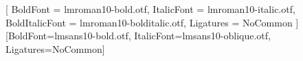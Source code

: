 %
%

\newcommand{\nomcandidat}{Prenom NOM}
\newcommand{\villecandidat}{Ville, Region}
\newcommand{\telcandidat}{+33 0 00 00 00 00}
\newcommand{\telcandidaturl}{+33000000000}
\newcommand{\mailcandidat}{prenom.nom@exemple.fr}
\newcommand{\githubcandidat}{https://github.com/identifiant}
\newcommand{\linkedincandidat}{https://www.linkedin.com/in/identifiant/}
\newcommand{\motsclescandidat}{}

\ifen
  \usepackage[english]{babel}
\else
  \usepackage[french]{babel}
\fi
\usepackage{fontspec}

\setmainfont{lmroman10-regular.otf}[
  BoldFont       = lmroman10-bold.otf,
  ItalicFont     = lmroman10-italic.otf,
  BoldItalicFont = lmroman10-bolditalic.otf,
  Ligatures      = NoCommon
]
\newfontfamily{}[BoldFont=lmsans10-bold.otf,
                                            ItalicFont=lmsans10-oblique.otf,
                                            Ligatures=NoCommon]


